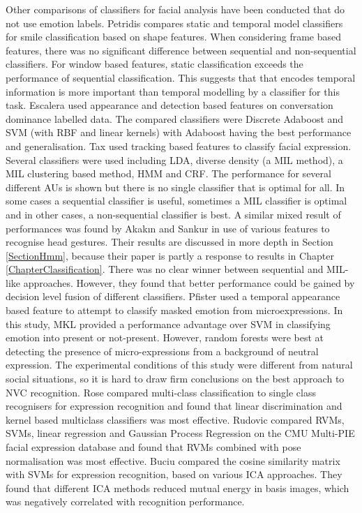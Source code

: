 Other comparisons of classifiers for facial analysis have been conducted that do not use emotion labels. Petridis \etal \cite{Petridis2009} compares static and temporal model classifiers for smile classification based on shape features. When considering frame based features, there was no significant difference between sequential and non-sequential classifiers. For window based features, static classification exceeds the performance of sequential classification. This suggests that \featureGeneration that encodes temporal information is more important than temporal modelling by a classifier for this task. Escalera \etal \cite{Escalera2009} used appearance and detection based features on conversation dominance labelled data. The compared classifiers were Discrete Adaboost and \ac{SVM} (with \ac{RBF} and linear kernels) with Adaboost having the best performance and generalisation. Tax \etal \cite{Tax2011} used tracking based features to classify facial expression. Several classifiers were used including \ac{LDA}, diverse density \cite{Maron1998} (a \ac{MIL} method), a \ac{MIL} clustering based method, \ac{HMM} and \ac{CRF}. The performance for several different \ac{AU}s is shown but there is no single classifier that is optimal for all.  In some cases a sequential classifier is useful, sometimes a \ac{MIL} classifier is optimal and in other cases, a non-sequential classifier is best. A similar mixed result of performances was found by Akak{\i}n and Sankur \cite{Akakin2011} in use of various features to recognise head gestures. Their results are discussed in more depth in Section \ref{SectionHmm}, because their paper is partly a response to results in Chapter \ref{ChapterClassification}. There was no clear winner between sequential and \ac{MIL}-like approaches. However, they found that better performance could be gained by decision level fusion of different classifiers. Pfister \etal \cite{Pfister2011, Pfister2011b} used a temporal appearance based feature to attempt to classify masked emotion from microexpressions. In this study, \ac{MKL} provided a performance advantage over \ac{SVM} in classifying emotion into present or not-present. However, random forests were best at detecting the presence of micro-expressions from a background of neutral expression. The experimental conditions of this study were different from natural social situations, so it is hard to draw firm conclusions on the best approach to \ac{NVC} recognition. Rose \cite{Rose2006} compared multi-class classification to single class recognisers for expression recognition and found that linear discrimination and kernel based multiclass classifiers was most effective. Rudovic \etal \cite{Rudovic2010} compared \ac{RVM}s, \ac{SVM}s, linear regression and Gaussian Process Regression on the CMU Multi-PIE facial expression database and found that \ac{RVM}s combined with pose normalisation was most effective. Buciu \etal \cite{Buciu2009} compared the cosine similarity matrix with \ac{SVM}s for expression recognition, based on various \ac{ICA} approaches. They found that different \ac{ICA} methods reduced mutual energy in basis images, which was negatively correlated with recognition performance.

